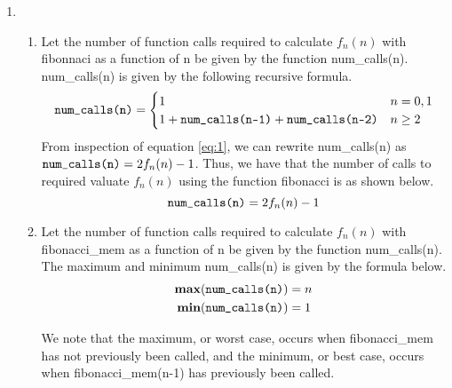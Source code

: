 \documentclass[11pt]{article}
\begin{document}
\begin{enumerate}[leftmargin=0.9in]
\begin{enumerate}[leftmargin=0.3in]
   \end{enumerate} %

\item %
   \begin{enumerate}[leftmargin=0.3in]
     \item Let the number of function calls required to calculate $f_n(n)$ with {\selectfont fibonnaci} as a function of n be given by the function {\selectfont num\_calls(n)}. {\selectfont num\_calls(n)} is given by the following recursive formula.
         \begin{equation} \label{eq:1}
            \text{{\fontfamily{cmtt}\selectfont num\_calls(n)}} = \begin{cases}
             1 & \text{$n = 0, 1$} \\
             1 + \text{{\fontfamily{cmtt}\selectfont num\_calls(n-1)}} + \text{{\fontfamily{cmtt}\selectfont num\_calls(n-2)}} & \text{$n \geq 2$}
           \end{cases}
        \end{equation}
        From inspection of equation \ref{eq:1}, we can rewrite {\selectfont num\_calls(n)} as $\text{{\fontfamily{cmtt}\selectfont num\_calls(n)}} = 2f_n(n) - 1$. Thus, we have that the number of calls to required valuate $f_n(n)$ using the function {\selectfont fibonacci} is as shown below.
        \begin{equation}
           \text{{\fontfamily{cmtt}\selectfont num\_calls(n)}} = 2f_n(n) - 1
        \end{equation}

      \item Let the number of function calls required to calculate $f_n(n)$ with {\selectfont fibonacci\_mem} as a function of n be given by the function {\selectfont num\_calls(n)}. The maximum and minimum {\selectfont num\_calls(n)} is given by the formula below.
        \begin{align} \label{eq:2}
          \textbf{max}(\text{{\fontfamily{cmtt}\selectfont num\_calls(n)}}) &= n \\
          \textbf{min}(\text{{\fontfamily{cmtt}\selectfont num\_calls(n)}}) &= 1
        \end{align}

        We note that the maximum, or worst case, occurs when {\selectfont fibonacci\_mem} has not previously been called, and the minimum, or best case, occurs when {\selectfont fibonacci\_mem(n-1)} has previously been called.


\end{enumerate}
\end{enumerate}
\end{document}
